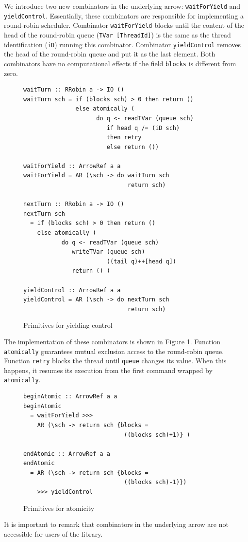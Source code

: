 \documentclass[times, 10pt,twocolumn]{article}
\begin{document}
  
We introduce two new combinators in the underlying arrow: 
\texttt{waitForYield} and \texttt{yieldControl}.  
Essentially, 
these combinators are responsible for implementing a round-robin 
scheduler. Combinator \texttt{waitForYield} blocks until 
the content of the head of the round-robin queue (\texttt{TVar
  [ThreadId]}) is the same as the thread identification (\texttt{iD})
running this combinator. Combinator \texttt{yieldControl} removes the head of the
round-robin queue and put it as the last element. Both combinators
have no computational effects if the field \texttt{blocks} is different
from zero. 
\begin{figure}[t]
\begin{Verbatim}[fontsize=\footnotesize]
waitTurn :: RRobin a -> IO ()
waitTurn sch = if (blocks sch) > 0 then return ()
               else atomically (
                     do q <- readTVar (queue sch)
                        if head q /= (iD sch)
                        then retry
                        else return ())

waitForYield :: ArrowRef a a
waitForYield = AR (\sch -> do waitTurn sch 
                              return sch)

nextTurn :: RRobin a -> IO ()
nextTurn sch 
  = if (blocks sch) > 0 then return ()
    else atomically (
           do q <- readTVar (queue sch)
              writeTVar (queue sch) 
                        ((tail q)++[head q])
              return () )

yieldControl :: ArrowRef a a
yieldControl = AR (\sch -> do nextTurn sch 
                              return sch)
\end{Verbatim}
\caption{\label{fig:yield} Primitives for yielding control}
\vspace{-10pt}
\end{figure}
The implementation of these combinators is shown in Figure 
\ref{fig:yield}.  
Function \texttt{atomically} guarantees mutual exclusion access 
to the round-robin queue.
Function \texttt{retry} blocks the thread until 
\texttt{queue} changes its value. When this happens, it resumes 
its execution from the first command wrapped by \texttt{atomically}.
\begin{figure}
\begin{Verbatim}[fontsize=\footnotesize]
beginAtomic :: ArrowRef a a 
beginAtomic 
  = waitForYield >>>
    AR (\sch -> return sch {blocks = 
                             ((blocks sch)+1)} )

endAtomic :: ArrowRef a a
endAtomic 
  = AR (\sch -> return sch {blocks = 
                             ((blocks sch)-1)})
    >>> yieldControl
\end{Verbatim}
\caption{Primitives for atomicity}
\label{fig:atomicity}
\end{figure}
It is important to remark that combinators in the underlying 
arrow are not accessible for users of the library.
 
\end{document}
